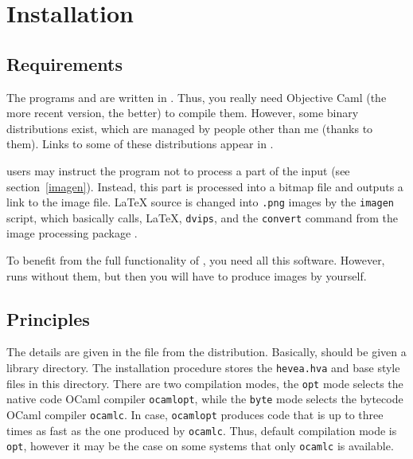 \section{Installation}

\subsection{Requirements}\label{requirements}
The programs  and  are written in
. Thus, you
really need Objective Caml (the more recent version, the better) to
compile them.
However, some binary distributions exist, which are managed by
people other than me (thanks to them).
Links to some of these distributions appear in .

\label{imagen:needs}\hevea{} users may instruct the program not to process a
part of the input (see section~\ref{imagen}). Instead, this part is
processed into a  bitmap file and \hevea{} outputs a  link to the image file.
\LaTeX{} source is changed into \verb+.png+ images by the \verb+imagen+
script, which basically calls, \LaTeX, \texttt{dvips},
and the \texttt{convert} command from the image processing package
.

To benefit from the full functionality of \hevea, you need all
this software. However, \hevea{} runs without them, but then you will
have to produce images by yourself.

\subsection{Principles}
The details are given in the 
file from the distribution.
Basically, \hevea{} should be given a library
directory. The installation procedure stores the \texttt{hevea.hva}
and base style files in this directory.
There are two compilation modes, the \texttt{opt} mode selects the
native code  OCaml compiler \texttt{ocamlopt}, while the \texttt{byte}
mode selects the bytecode  OCaml compiler \texttt{ocamlc}.
In \hevea{} case, \texttt{ocamlopt} produces code that is up to three
times as fast as the one produced by \texttt{ocamlc}.
Thus, default compilation mode is \texttt{opt}, however it may be the
case on some systems that only \texttt{ocamlc} is available.


